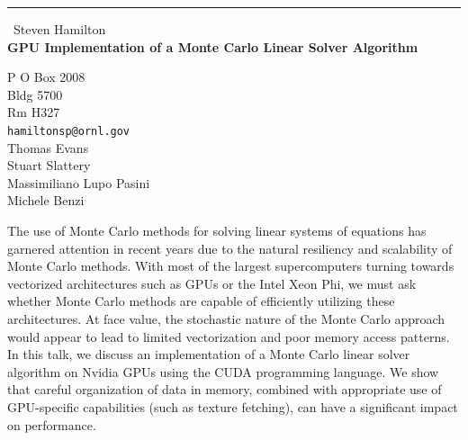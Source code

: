 \documentclass{report}
\begin{document}
\begin{center}
\rule{6in}{1pt} \
{\large Steven Hamilton \\
{\bf GPU Implementation of a Monte Carlo Linear Solver Algorithm}}

P O Box 2008 \\ Bldg 5700 \\ Rm H327
\\
{\tt hamiltonsp@ornl.gov}\\
Thomas Evans\\
Stuart Slattery\\
Massimiliano Lupo Pasini\\
Michele Benzi\end{center}

The use of Monte Carlo methods for solving linear systems of equations
has garnered attention in recent years due to the natural resiliency and
scalability of Monte Carlo methods. With most of the largest
supercomputers turning towards vectorized architectures such as GPUs or
the Intel Xeon Phi, we must ask whether Monte Carlo methods are capable
of efficiently utilizing these architectures. At face value, the
stochastic nature of the Monte Carlo approach would appear to lead to
limited vectorization and poor memory access patterns. In this talk, we
discuss an implementation of a Monte Carlo linear solver algorithm on
Nvidia GPUs using the CUDA programming language. We show that careful
organization of data in memory, combined with appropriate use of
GPU-specific capabilities (such as texture fetching), can have a
significant impact on performance.
\end{document}
